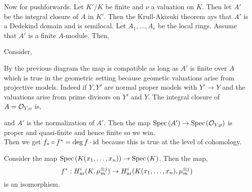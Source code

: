 \documentclass[12pt]{article}
\begin{document}
Now for pushforwards. Let $K' / K$ be finite and $\nu$ a valuation on $K$. Then let $A'$ be the integral closure of $A$ in $K'$. Then the Krull-Akizuki theorem ays that $A'$ is a Dedekind domain and is semilocal. Let $A_1, \dots, A_r$ be the local rings. Assume that $A'$ is a finite $A$-module. Then,
\begin{center}
\end{center}
Consider,
\begin{center}
\end{center}
By the previous diagram the map is compatible as long as $A'$ is finite over $A$ which is true in the geometric setting because geometic valuations arise from projective models. Indeed if $Y, Y'$ are normal proper models with $Y' \to Y$ and the valuations arise from prime divisors on $Y'$ and $Y$. The integral closure of $A = \mathcal{O}_{Y, o}$ is,
\begin{center}
\end{center} 
and $A'$ is the normalization of $A'$. Then the map $\mathrm{Spec}\left( A' \right) \to \mathrm{Spec}\left( \mathcal{O}_{Y, p} \right)$ is proper and quasi-finite and hence finite so we win.
\bigskip\\
Then we get $f_* \circ f^* = \deg{f} \cdot \mathrm{id}$ because this is true at the level of \etale cohomology.

\begin{theorem}
Consider the map $\mathrm{Spec}\left( K(x_1, \dots, x_n) \right) \to \mathrm{Spec}\left( K \right)$. Then the map,
\[ f^* : H^i_{\mathrm{nr}}(K, \mu_m^{\otimes j}) \to H^i_{\mathrm{nr}}(K(x_1, \dots, x_n), \mu_m^{\otimes j}) \]
is an isomorphism.
\end{theorem}
\end{document}
